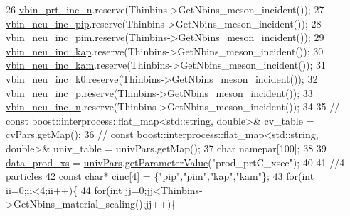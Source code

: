 \begin{DoxyCode}
26     \hyperlink{class_neutrino_flux_reweight_1_1_thin_targetnucleon_a_reweighter_a2f5a030bd0654de8d5d62294ca7441d9}{vbin\_prt\_inc\_n}.reserve(Thinbins->GetNbins\_meson\_incident());
27     \hyperlink{class_neutrino_flux_reweight_1_1_thin_targetnucleon_a_reweighter_ae47fb7b28a9a98bcf896bc93b96c371d}{vbin\_neu\_inc\_pip}.reserve(Thinbins->GetNbins\_meson\_incident());
28     \hyperlink{class_neutrino_flux_reweight_1_1_thin_targetnucleon_a_reweighter_a7643f9d1002efdd8030f0a2016cfd5f4}{vbin\_neu\_inc\_pim}.reserve(Thinbins->GetNbins\_meson\_incident());
29     \hyperlink{class_neutrino_flux_reweight_1_1_thin_targetnucleon_a_reweighter_a1ec58cec8bcce352e693785f7f7c7904}{vbin\_neu\_inc\_kap}.reserve(Thinbins->GetNbins\_meson\_incident());
30     \hyperlink{class_neutrino_flux_reweight_1_1_thin_targetnucleon_a_reweighter_a7c77ff20d31c4d95447e593726d267b0}{vbin\_neu\_inc\_kam}.reserve(Thinbins->GetNbins\_meson\_incident());
31     \hyperlink{class_neutrino_flux_reweight_1_1_thin_targetnucleon_a_reweighter_adaee6b1fb0e48aa2e40806ac78937b94}{vbin\_neu\_inc\_k0}.reserve(Thinbins->GetNbins\_meson\_incident());
32     \hyperlink{class_neutrino_flux_reweight_1_1_thin_targetnucleon_a_reweighter_a73c1e6b171db3486462eb3c0e6899396}{vbin\_neu\_inc\_p}.reserve(Thinbins->GetNbins\_meson\_incident());
33     \hyperlink{class_neutrino_flux_reweight_1_1_thin_targetnucleon_a_reweighter_a270e10a3f2bc7ece4a7bf35e88ca5061}{vbin\_neu\_inc\_n}.reserve(Thinbins->GetNbins\_meson\_incident());
34 
35     \textcolor{comment}{// const boost::interprocess::flat\_map<std::string, double>& cv\_table   = cvPars.getMap();}
36     \textcolor{comment}{// const boost::interprocess::flat\_map<std::string, double>& univ\_table = univPars.getMap();}
37     \textcolor{keywordtype}{char} namepar[100];
38     
39     \hyperlink{class_neutrino_flux_reweight_1_1_thin_targetnucleon_a_reweighter_a47e99efcf073246a61f4a5bd4db3574e}{data\_prod\_xs} = \hyperlink{class_neutrino_flux_reweight_1_1_thin_targetnucleon_a_reweighter_a56d10ce15819c77e9d4a6538f403b71e}{univPars}.\hyperlink{class_neutrino_flux_reweight_1_1_parameter_table_acb7dc8335b65b116f6092f2fa57ca5ed}{getParameterValue}(\textcolor{stringliteral}{"prod\_prtC\_xsec"});
40     
41     \textcolor{comment}{//4 particles}
42     \textcolor{keyword}{const} \textcolor{keywordtype}{char}* cinc[4] = \{\textcolor{stringliteral}{"pip"},\textcolor{stringliteral}{"pim"},\textcolor{stringliteral}{"kap"},\textcolor{stringliteral}{"kam"}\};    
43     \textcolor{keywordflow}{for}(\textcolor{keywordtype}{int} ii=0;ii<4;ii++)\{
44       \textcolor{keywordflow}{for}(\textcolor{keywordtype}{int} jj=0;jj<Thinbins->GetNbins\_material\_scaling();jj++)\{

\end{DoxyCode}
